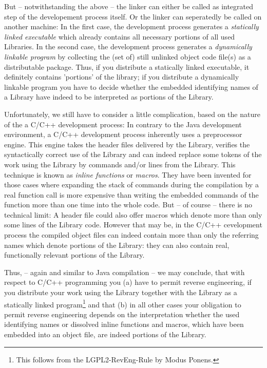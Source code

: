 But -- notwithstanding the above -- the linker can either be called as
integrated step of the developement process itself. Or the linker can
seperatedly be called on another machine: In the first case, the development
process generates a \emph{statically linked executable} which already contains
all necessary portions of all used Libraries. In the second case, the
development process generates a \emph{dynamically linkable program} by
collecting the (set of) still unlinked object code file(s) as a distributable
package. Thus, if you distribute a statically linked executable, it definitely
contains 'portions' of the library; if you distribute a dynamically linkable
program you have to decide whether the embedded identifying names of a Library
have indeed to be interpreted as portions of the Library.

Unfortunately, we still have to consider a little complication, based on the
nature of the a C/C++ development process: In contrary to the Java development
environment, a C/C++ development process inherently uses a preprocessor engine.
This engine takes the header files delivered by the Library, verifies the
syntactically correct use of the Library and can indeed replace some tokens of
the work using the Library by commands and/or lines from the Library. This
technique is known as \emph{inline functions} or \emph{macros}. They have been
invented for those cases where expanding the stack of commands during the
compilation by a real function call is more expensive than writing the embedded
commands of the function more than one time into the whole code. But -- of
course -- there is no technical limit: A header file could also offer macros
which denote more than only some lines of the Library code. However that may be,
in the C/C++ cevelopment process the compiled object files can indeed contain
more than only the referring names which denote portions of the Library:
they can also contain real, functionally relevant portions of the Library.
 
Thus, -- again and similar to Java compilation -- we may conclude, that with
respect to C/C++ programming you (a) have to permit reverse engineering, if you
distribute your work using the Library together with the Library as a statically
linked program\footnote{This follows from the LGPL2-RevEng-Rule by Modus
Ponens.} and that (b) in all other cases your obligation to permit reverse
engineering depends on the interpretation whether the used identifying names or
dissolved inline functions and macros, which have been embedded into an object
file, are indeed portions of the Library.

